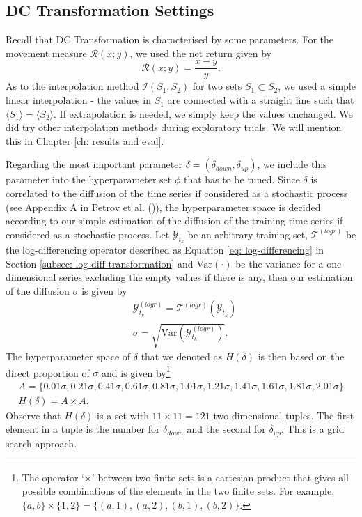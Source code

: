 \subsection{DC Transformation Settings}
Recall that DC Transformation is characterised by some parameters. For the movement measure $\mathcal{R} (x; y)$, we used the net return given by
\begin{equation*}
    \mathcal{R} (x; y) = \frac{x - y}{y}.
\end{equation*}
As to the interpolation method $\mathcal{I} (S_1, S_2)$ for two sets $S_1 \subset S_2$, we used a simple linear interpolation - the values in $S_1$ are connected with a straight line such that $\langle S_1 \rangle = \langle S_2 \rangle$. If extrapolation is needed, we simply keep the values unchanged. We did try other interpolation methods during exploratory trials. We will mention this in Chapter \ref{ch: results and eval}.

Regarding the most important parameter $\delta = (\delta_{down}, \delta_{up})$, we include this parameter into the hyperparameter set $\phi$ that has to be tuned. Since $\delta$ is correlated to the diffusion of the time series if considered as a stochastic process (see Appendix A in Petrov et al. (\citeyear{petrov2018agent})), the hyperparameter space is decided according to our simple estimation of the diffusion of the training time series if considered as a stochastic process. Let $\mathcal{Y}_{t_k}$ be an arbitrary training set, $\mathcal{T}^{(logr)}$ be the log-differencing operator described as Equation \ref{eq: log-differencing} in Section \ref{subsec: log-diff transformation} and $\text{Var}(\cdot)$ be the variance for a one-dimensional series excluding the empty values if there is any, then our estimation of the diffusion $\sigma$ is given by
\begin{align*}
    &\mathcal{Y}^{(logr)}_{t_k} = \mathcal{T}^{(logr)}(\mathcal{Y}_{t_k}) \\
    &\sigma = \sqrt{\text{Var}(\mathcal{Y}^{(logr)}_{t_k})}.
\end{align*}
The hyperparameter space of $\delta$ that we denoted as $H(\delta)$ is then based on the direct proportion of $\sigma$ and is given by\footnote{The operator `$\times$' between two finite sets is a cartesian product that gives all possible combinations of the elements in the two finite sets. For example, $\{a, b \} \times \{ 1, 2 \} = \{ (a, 1), (a, 2), (b, 1), (b, 2) \}$.}
\begin{gather*}
    A = \{ 0.01 \sigma, 0.21 \sigma, 0.41 \sigma, 0.61 \sigma, 0.81 \sigma, 1.01 \sigma, 1.21 \sigma, 1.41 \sigma, 1.61 \sigma, 1.81 \sigma, 2.01 \sigma \} \\
    H(\delta) = A \times A.
\end{gather*}
Observe that $H(\delta)$ is a set with $11 \times 11 = 121$ two-dimensional tuples. The first element in a tuple is the number for $\delta_{down}$ and the second for $\delta_{up}$. This is a grid search approach.

